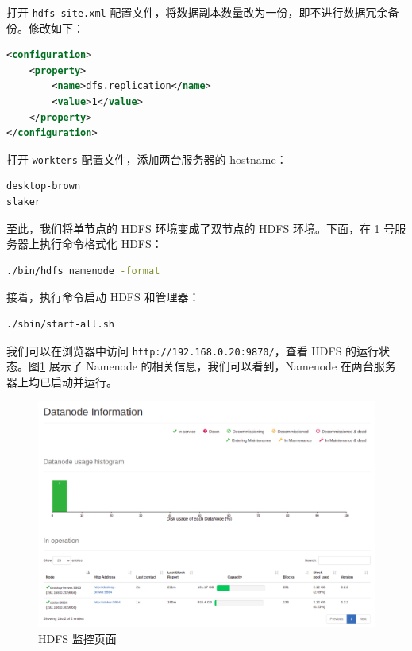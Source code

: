 \documentclass{ctexart}
\newcommand{\code}[1]{\colorbox{backcolor}{\lstinline|#1|}}
\begin{document}
    打开 \code{hdfs-site.xml} 配置文件，将数据副本数量改为一份，即不进行数据冗余备份。修改如下：

    \begin{lstlisting}[language=XML]
<configuration>
    <property>
        <name>dfs.replication</name>
        <value>1</value>
    </property>
</configuration>
    \end{lstlisting}

    打开 \code{workters} 配置文件，添加两台服务器的 hostname：

    \begin{lstlisting}[language=bash]
desktop-brown
slaker
    \end{lstlisting}

    至此，我们将单节点的 HDFS 环境变成了双节点的 HDFS 环境。下面，在 1 号服务器上执行命令格式化 HDFS：

    \begin{lstlisting}[language=bash]
./bin/hdfs namenode -format
    \end{lstlisting}

    接着，执行命令启动 HDFS 和管理器：

    \begin{lstlisting}[language=bash]
./sbin/start-all.sh
    \end{lstlisting}

    我们可以在浏览器中访问 \code{http://192.168.0.20:9870/}，查看 HDFS 的运行状态。图\ref{fig:archicture_hdfs-web} 展示了 Namenode 的相关信息，我们可以看到，Namenode 在两台服务器上均已启动并运行。

    \begin{figure}[t]
        \centering
        \includegraphics[width=\textwidth]{src/archicture_hdfs-web}
        \caption{HDFS 监控页面}
        \label{fig:archicture_hdfs-web}
    \end{figure}
\end{document}
